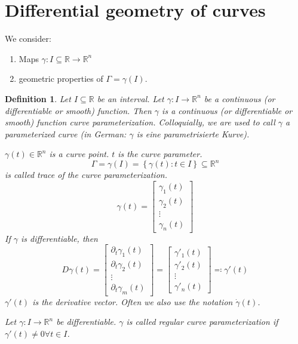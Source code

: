 \documentclass{article}
\newtheorem{definition}{Definition}  \numberwithin{definition}{section}
\newcommand{\set}[1]{\left\{#1\right\}}
\begin{document}
\section{Differential geometry of curves}

We consider:
\begin{enumerate}
  \item Maps $\gamma: I \subseteq \mathbb R \to \mathbb R^n$
  \item geometric properties of $\Gamma = \gamma(I)$.
\end{enumerate}

\begin{definition} %
  Let $I \subseteq \mathbb R$ be an interval.
  Let $\gamma: I \to \mathbb R^n$ be a continuous (or differentiable or smooth) function.
  Then $\gamma$ is a continuous (or differentiable or smooth) function curve parameterization.
  Colloquially, we are used to call $\gamma$ a \emph{parameterized curve} (in German: \foreignlanguage{german}{$\gamma$ is eine parametrisierte Kurve}).

  $\gamma(t) \in \mathbb R^n$ is a curve point.
  $t$ is the curve parameter.
  \[ \Gamma = \gamma(I) = \set{\gamma(t): t \in I} \subseteq \mathbb R^n \]
  is called trace of the curve parameterization.
  \[ \gamma(t) = \begin{bmatrix} \gamma_1(t) \\ \gamma_2(t) \\ \vdots \\ \gamma_n(t) \end{bmatrix} \]
  If $\gamma$ is differentiable, then
  \[ D\gamma(t)
        = \begin{bmatrix} \partial_t \gamma_1(t) \\ \partial_t \gamma_2(t) \\ \vdots \\ \partial_t \gamma_m(t) \end{bmatrix}
        = \begin{bmatrix} \gamma'_1(t) \\ \gamma'_2(t) \\ \vdots \\ \gamma'_n(t) \end{bmatrix} \eqqcolon \gamma'(t)
  \]
  $\gamma'(t)$ is the derivative vector. Often we also use the notation $\dot{\gamma}(t)$.

  Let $\gamma: I \to \mathbb R^n$ be differentiable.
  $\gamma$ is called \emph{regular curve parameterization} if $\gamma'(t) \neq 0 \forall t \in I$.
\end{definition}
\end{document}
